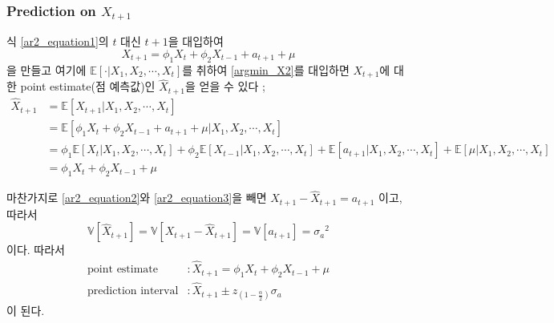 \documentclass{article}
\newcommand\sa{\ensuremath{{\sigma_a}}}
\begin{document}
\subsubsection{Prediction on \(X_{t+1}\)}
식 \eqref{ar2_equation1}의 \(t\) 대신 \(t+1\)을 대입하여
\begin{equation}\label{ar2_equation2}
X_{t+1}=\phi_1X_t+\phi_2X_{t-1}+a_{t+1}+\mu
\end{equation}
을 만들고 여기에 \(\mathbb E[\cdot|X_1,X_2,\cdots,X_t]\)를 취하여 \eqref{argmin_X2}를 대입하면 \(X_{t+1}\)에 대한 point estimate(점 예측값)인 \(\hat X_{t+1}\)을 얻을 수 있다 ;
\begin{equation}\label{ar2_equation3}
\begin{aligned}
\hat X_{t+1}
&=\mathbb E\left[X_{t+1}|X_1,X_2,\cdots,X_t\right]\\
&=\mathbb E\left[\phi_1X_t+\phi_2X_{t-1}+a_{t+1}+\mu|X_1,X_2,\cdots,X_t\right]\\
&=\phi_1\mathbb E\left[X_t|X_1,X_2,\cdots,X_t\right]+\phi_2\mathbb E\left[X_{t-1}|X_1,X_2,\cdots,X_t\right]+\mathbb E\left[a_{t+1}|X_1,X_2,\cdots,X_t\right]+\mathbb E\left[\mu|X_1,X_2,\cdots,X_t\right]\\
&=\phi_1 X_t+\phi_2 X_{t-1}+\mu
\end{aligned}
\end{equation}

마찬가지로
\eqref{ar2_equation2}와 \eqref{ar2_equation3}을 빼면
\(X_{t+1}-\hat X_{t+1}=a_{t+1}\)
이고, 따라서
\[\mathbb V[\hat X_{t+1}]=\mathbb V[X_{t+1}-\hat X_{t+1}]=\mathbb V[a_{t+1}]=\sa^2\]
이다.
따라서
\begin{align*}
\text{point estimate}		&:\hat X_{t+1} = \phi_1X_t+\phi_2X_{t-1}+\mu\\
\text{prediction interval}	&:\hat X_{t+1}\pm z_{(1-\frac\alpha2)}\sa
\end{align*}
이 된다.

%
\end{document}

